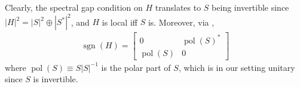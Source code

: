 \documentclass[a4paper,10pt]{article}
\numberwithin{equation}{section}
\theoremstyle{plain}
\theoremstyle{plain}
\newtheorem{lem}[thm]{\protect\lemmaname}
\theoremstyle{plain}
\theoremstyle{plain}
\theoremstyle{plain}
\theoremstyle{remark}
\theoremstyle{definition}
\theoremstyle{plain}
\providecommand{\lemmaname}{Lemma}
\newcommand{\sgn}{\operatorname{sgn}}
\newcommand{\eql}[1]{\begin{align}#1\end{align}}
\newcommand{\polar}{\operatorname{pol}}
\begin{document}
	Clearly, the spectral gap condition on $H$ translates to $S$ being invertible since $|H|^2=|S|^2\oplus|S^\ast|^2$, and $H$ is local iff $S$ is.
	Moreover, via \cite[Lemma 2]{Graf_Shapiro_2018_1D_Chiral_BEC}, \eql{\label{eq:correspondence between chiral flat hamiltonian and off-diagonal sub-block} \sgn(H) = \begin{bmatrix}
			0 & \polar(S)^\ast \\
			\polar(S) & 0
	\end{bmatrix} } where $\polar(S)\equiv S|S|^{-1}$ is the polar part of $S$, which is in our setting unitary since $S$ is invertible.
	
\end{document}

